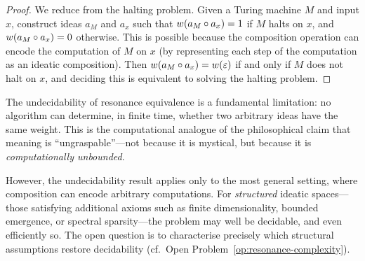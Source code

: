 \begin{proof}
We reduce from the halting problem.  Given a Turing machine $M$ and
input $x$, construct ideas $a_M$ and $a_x$ such that
$w(a_M \circ a_x) = 1$ if $M$ halts on $x$, and
$w(a_M \circ a_x) = 0$ otherwise.  This is possible because the
composition operation can encode the computation of $M$ on $x$
(by representing each step of the computation as an ideatic composition).
Then $w(a_M \circ a_x) = w(\varepsilon)$ if and only if $M$ does not halt
on $x$, and deciding this is equivalent to solving the halting problem.
\end{proof}

\begin{interpretation}
The undecidability of resonance equivalence is a fundamental limitation:
no algorithm can determine, in finite time, whether two arbitrary ideas
have the same weight.  This is the computational analogue of the
philosophical claim that meaning is ``ungraspable''---not because it is
mystical, but because it is \emph{computationally unbounded}.

However, the undecidability result applies only to the most general
setting, where composition can encode arbitrary computations.  For
\emph{structured} ideatic spaces---those satisfying additional axioms
such as finite dimensionality, bounded emergence, or spectral
sparsity---the problem may well be decidable, and even efficiently
so.  The open question is to characterise precisely which structural
assumptions restore decidability (cf.\ Open Problem~\ref{op:resonance-complexity}).
\end{interpretation}

